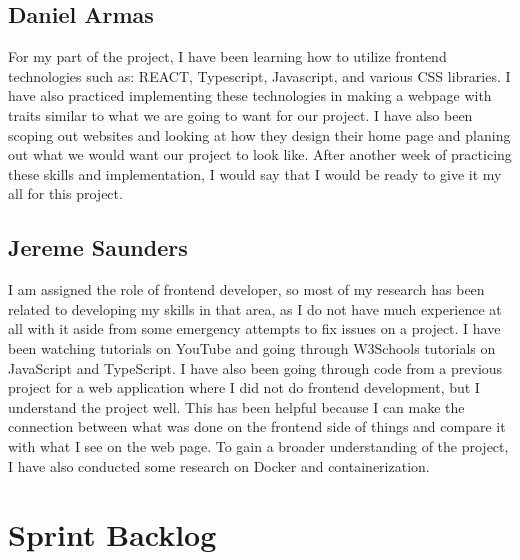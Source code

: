 \documentclass[12pt]{article}
\begin{document}
\subsection{Daniel Armas}
For my part of the project, I have been learning how to utilize frontend technologies such as: REACT, Typescript, Javascript, and various CSS libraries. I have also practiced implementing these technologies in making a webpage with traits similar to what we are going to want for our project. I have also been scoping out websites and looking at how they design their home page and planing out what we would want our project to look like. After another week of practicing these skills and implementation, I would say that I would be ready to give it my all for this project. 

\subsection{Jereme Saunders}
I am assigned the role of frontend developer, so most of my research has been related to developing my skills in that area, as I do not have much experience at all with it aside from some emergency attempts to fix issues on a project. I have been watching tutorials on YouTube and going through W3Schools tutorials on JavaScript and TypeScript.  I have also been going through code from a previous project for a web application where I did not do frontend development, but I understand the project well. This has been helpful because I can make the connection between what was done on the frontend side of things and compare it with what I see on the web page. To gain a broader understanding of the project, I have also conducted some research on Docker and containerization.

\section{Sprint Backlog}
\end{document}
